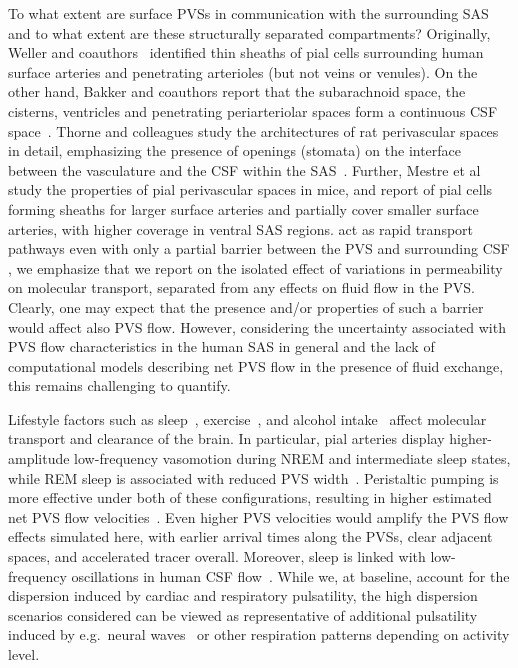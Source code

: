 \documentclass[fleqn,10pt]{wlscirep}
\providecommand{\DIFadd}[1]{{\protect\color{blue}\uwave{#1}}} %
\providecommand{\DIFaddbegin}{} %
\providecommand{\DIFaddend}{} %
\begin{document}
To what extent are surface PVSs in communication with the surrounding
SAS and to what extent are these structurally separated compartments?
Originally, Weller and coauthors~\cite{zhang1990interrelationships,
  zhang1992directional, weller2005microscopic} identified thin sheaths
of pial cells surrounding human surface arteries and penetrating
arterioles (but not veins or venules). On the other hand, Bakker and
coauthors report that the subarachnoid space, the cisterns, ventricles
and penetrating periarteriolar spaces form a continuous CSF
space~\cite{bedussi2017paravascular}. Thorne and colleagues study the
architectures of rat perivascular spaces in detail, emphasizing the
presence of openings (stomata) on the interface between the
vasculature and the CSF within the SAS~\cite{pizzo2018intrathecal,
  hannocks2018molecular}. Further, Mestre et
al~\cite{mestre2022periarteriolar} study the properties of pial
perivascular spaces in mice, and report of pial cells forming sheaths
for larger surface arteries and partially cover smaller surface
arteries, with higher coverage in ventral SAS regions.  \DIFaddbegin \DIFadd{In our
simulations, the PVSs }\DIFaddend act as rapid transport pathways even with only a
partial barrier between the PVS and surrounding CSF \DIFaddbegin \DIFadd{. Here}\DIFaddend , we
emphasize that we report on the isolated effect of variations in
permeability on molecular transport, separated from any effects on
fluid flow in the PVS. Clearly, one may expect that the presence
and/or properties of such a barrier would affect also PVS
flow. However, considering the uncertainty associated with PVS flow
characteristics in the human SAS in general and the lack of
computational models describing net PVS flow in the presence of fluid
exchange, this remains challenging to quantify.

Lifestyle factors such as sleep~\cite{xie2013sleep, miao2024brain,
  bojarskaite2023sleep, eide2021sleep, vinje2023human,
  hauglund2025norepinephrine, larsen2024sleep},
exercise~\cite{holstein2018voluntary, yildiz2022immediate}, and
alcohol intake~\cite{lundgaard2018beneficial} affect molecular
transport and clearance of the brain. In particular, pial arteries
display higher-amplitude low-frequency vasomotion during NREM and
intermediate sleep states, while REM sleep is associated with reduced
PVS width~\cite{bojarskaite2023sleep}. Peristaltic pumping is more
effective under both of these configurations, resulting in higher
estimated net PVS flow velocities~\cite{gjerde2023directional}. Even
higher PVS velocities would amplify the PVS flow effects simulated
here, with earlier arrival times along the PVSs, clear  \DIFaddbegin \DIFadd{distribution
into }\DIFaddend adjacent spaces, and accelerated tracer  \DIFaddbegin \DIFadd{spread }\DIFaddend overall. Moreover,
sleep is linked with low-frequency oscillations in human CSF
flow~\cite{fultz2019coupled}.  While we, at baseline, account for the dispersion
induced by cardiac and respiratory pulsatility, the high dispersion
scenarios considered can be viewed as representative of additional
pulsatility induced by e.g.~neural waves~\cite{fultz2019coupled,
  williams2023neural} or other respiration patterns depending on
activity level. 
\end{document}
